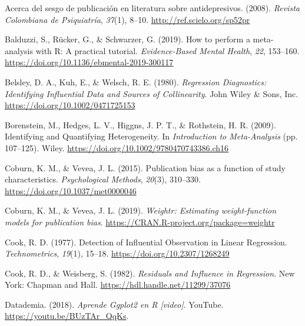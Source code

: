 \documentclass[
  bookmarksnumbered]{article}
\newlength{\cslhangindent}
\newlength{\cslentryspacingunit} %
\newenvironment{CSLReferences}[2] %
 {%
  \setlength{\parindent}{0pt}
  \ifodd #1
  \let\oldpar\par
  \def\par{\hangindent=\cslhangindent\oldpar}
  \fi
  \setlength{\parskip}{#2\cslentryspacingunit}
 }%
 {}
\begin{document}
\hypertarget{refs}{}
\begin{CSLReferences}{1}{0}
\leavevmode{}%
{Acerca del sesgo de publicación en literatura sobre antidepresivos}. (2008). \emph{Revista Colombiana de Psiquiatría}, \emph{37}(1), 8--10. \url{http://ref.scielo.org/sp52pr}

\leavevmode{}%
Balduzzi, S., Rücker, G., \& Schwarzer, G. (2019). How to perform a meta-analysis with {R}: A practical tutorial. \emph{Evidence-Based Mental Health}, \emph{22}, 153--160. \url{https://doi.org/10.1136/ebmental-2019-300117}

\leavevmode{}%
Belsley, D. A., Kuh, E., \& Welsch, R. E. (1980). \emph{Regression {Diagnostics}: {Identifying Influential Data} and {Sources} of {Collinearity}}. {John Wiley \& Sons, Inc.} \url{https://doi.org/10.1002/0471725153}

\leavevmode{}%
Borenstein, M., Hedges, L. V., Higgns, J. P. T., \& Rothstein, H. R. (2009). Identifying and {Quantifying Heterogeneity}. In \emph{Introduction to {Meta}-{Analysis}} (pp. 107--125). Wiley. \url{https://doi.org/10.1002/9780470743386.ch16}

\leavevmode{}%
Coburn, K. M., \& Vevea, J. L. (2015). Publication bias as a function of study characteristics. \emph{Psychological Methods}, \emph{20}(3), 310--330. \url{https://doi.org/10.1037/met0000046}

\leavevmode{}%
Coburn, K. M., \& Vevea, J. L. (2019). \emph{Weightr: Estimating weight-function models for publication bias}. \url{https://CRAN.R-project.org/package=weightr}

\leavevmode{}%
Cook, R. D. (1977). Detection of {Influential Observation} in {Linear Regression}. \emph{Technometrics}, \emph{19}(1), 15--18. \url{https://doi.org/10.2307/1268249}

\leavevmode{}%
Cook, R. D., \& Weisberg, S. (1982). \emph{Residuals and {Influence} in {Regression}}. {New York: Chapman and Hall}. \url{https://hdl.handle.net/11299/37076}

\leavevmode{}%
Datademia. (2018). \emph{Aprende {Ggplot2} en {R} \emph{{[}video{]}}}. YouTube. \url{https://youtu.be/BUzTAr_QqKs}.


\end{CSLReferences}
\end{document}
